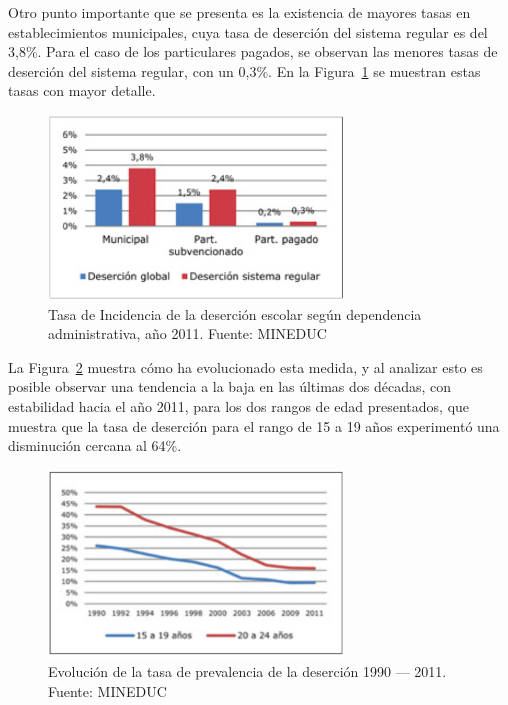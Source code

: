 Otro punto importante que se presenta es la existencia de mayores tasas en establecimientos municipales, cuya tasa de deserción del sistema regular es del 3,8\%. Para el caso de los particulares pagados, se observan las menores tasas de deserción del sistema regular, con un 0,3\%. En la Figura~\ref{fig:admin} se muestran estas tasas con mayor detalle.

\begin{figure}[H]
  \centering
    \includegraphics[width=0.7\textwidth]{Figuras/desercionadmin}
      \caption{Tasa de Incidencia de la deserción escolar según dependencia administrativa, año 2011. Fuente: MINEDUC}
    \label{fig:admin}
\end{figure}

La Figura~\ref{fig:tasaanual} muestra cómo ha evolucionado esta medida, y al analizar esto es posible observar una tendencia a la baja en las últimas dos décadas, con estabilidad hacia el año 2011, para los dos rangos de edad presentados, que muestra que la tasa de deserción para el rango de 15 a 19 años experimentó una disminución cercana al 64\%.

\begin{figure}[H]
  \centering
    \includegraphics[width=0.7\textwidth]{Figuras/TasaDesAnual}
      \caption{Evolución de la tasa de prevalencia de la deserción 1990 — 2011. Fuente: MINEDUC}
    \label{fig:tasaanual}
\end{figure}

